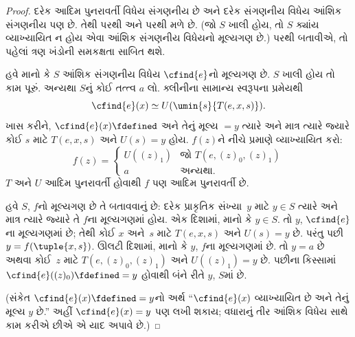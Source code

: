 \documentclass[../../../include/open-logic-section]{subfiles}
\begin{document}
\begin{proof}
દરેક આદિમ પુનરાવર્તી વિધેય સંગણનીય છે અને દરેક સંગણનીય વિધેય
આંશિક સંગણનીય પણ છે. તેથી  પરથી
 અને  પરથી
 મળે છે. (જો $S$ ખાલી હોય, તો $S$ ક્યાંય
વ્યાખ્યાયિત ન હોય એવા આંશિક સંગણનીય વિધેયનો મૂલ્યગણ છે.)
 પરથી  બતાવીએ,
તો પહેલાં ત્રણ ખંડોની સમકક્ષતા સાબિત થશે.

હવે માનો કે $S$ આંશિક સંગણનીય વિધેય $\cfind{e}$નો મૂલ્યગણ
છે. $S$ ખાલી હોય તો કામ પૂરું. અન્યથા $S$નું કોઈ તત્ત્વ $a$
લો. ક્લીનીના સામાન્ય સ્વરૂપના પ્રમેયથી
\[
\cfind{e}(x) \simeq U(\umin{s}{T(e, x, s)}).
\]
ખાસ કરીને, $\cfind{e}(x) \fdefined$ અને તેનું મૂલ્ય $= y$
ત્યારે અને માત્ર ત્યારે જ્યારે કોઈ $s$ માટે $T(e, x, s)$
અને $U(s) = y$ હોય. $f(z)$ને નીચે પ્રમાણે વ્યાખ્યાયિત કરો:
\[
f(z) = \begin{cases}
  U((z)_1) & \text{જો $T(e, (z)_0, (z)_1)$} \\
  a        & \text{અન્યથા.}
\end{cases}
\]
$T$ અને $U$ આદિમ પુનરાવર્તી હોવાથી $f$ પણ આદિમ પુનરાવર્તી
છે. 

હવે $S$, $f$નો મૂલ્યગણ છે તે બતાવવાનું છે: દરેક પ્રાકૃતિક
સંખ્યા~$y$ માટે $y \in S$ ત્યારે અને માત્ર ત્યારે જ્યારે
તે $f$ના મૂલ્યગણમાં હોય. એક દિશામાં, માનો કે $y \in S$.
તો $y$, $\cfind{e}$ના મૂલ્યગણમાં છે; તેથી કોઈ $x$ અને~$s$
માટે $T(e,x,s)$ અને $U(s) = y$ છે. પરંતુ પછી
$y = f(\tuple{x,s})$. ઊલટી દિશામાં, માનો કે $y$, $f$ના
મૂલ્યગણમાં છે. તો $y = a$ છે અથવા કોઈ~$z$ માટે
$T(e,(z)_0,(z)_1)$ અને $U((z)_1) = y$ છે. પછીના કિસ્સામાં
$\cfind{e}((z)_0) \fdefined = y$ હોવાથી બંને રીતે $y$,
$S$માં છે.

(સંકેત $\cfind{e}(x) \fdefined = y$નો અર્થ
``$\cfind{e}(x)$ વ્યાખ્યાયિત છે અને તેનું મૂલ્ય $y$ છે.''
અહીં $\cfind{e}(x) = y$ પણ લખી શકાય; વધારાનું તીર
આંશિક વિધેય સાથે કામ કરીએ છીએ એ યાદ અપાવે છે.)


\end{proof}
\end{document}
